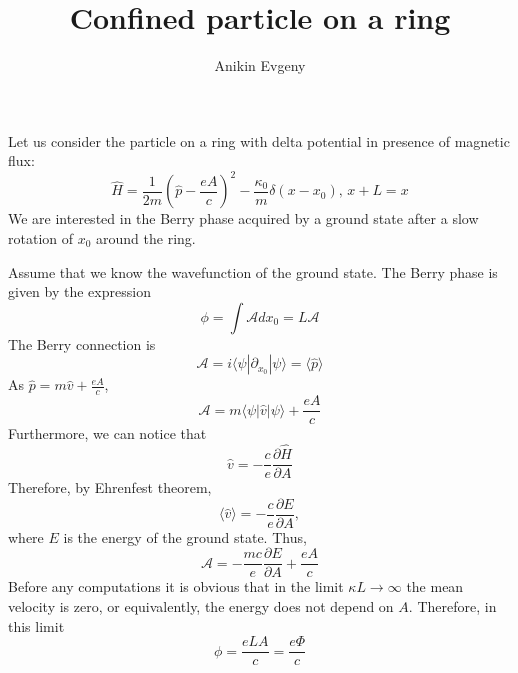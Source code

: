 \documentclass{article}
\title{Confined particle on a ring}
\author{Anikin Evgeny}
\begin{document}
\maketitle
Let us consider the particle on a ring with delta potential in presence of magnetic flux:
\begin{equation}
    \hat{H} = \frac{1}{2m}\left(\hat{p} - \frac{eA}{c}\right)^2 
            - \frac{\kappa_0}{m}\delta(x - x_0),
    \, x + L = x
\end{equation}
We are interested in the Berry phase acquired by a ground state 
after a slow rotation of $x_0$ around the ring.

Assume that we know the wavefunction of the ground state. The Berry phase is given
by the expression
\begin{equation}
    \phi = \int \mathcal{A} dx_0 = L\mathcal{A}
\end{equation}
The Berry connection is 
\begin{equation}
    \mathcal{A} = i\langle \psi | \partial_{x_0} | \psi \rangle =
            \langle \hat{p} \rangle
\end{equation}
As $\hat{p} = m\hat{v} + \frac{eA}{c}$,
\begin{equation}
    \mathcal{A} = m\langle \psi | \hat{v} | \psi \rangle 
             +\frac{eA}{c}
\end{equation}
Furthermore, we can notice that 
\begin{equation}
    \hat{v} = -\frac{c}{e}\frac{\partial \hat{H}}{\partial A}
\end{equation}
Therefore, by Ehrenfest theorem,
\begin{equation}
    \langle \hat{v} \rangle = -\frac{c}{e} \frac{\partial E}{\partial A},
\end{equation}
where $E$ is the energy of the ground state.
Thus,
\begin{equation}
    \mathcal{A} = -\frac{mc}{e}\frac{\partial E}{\partial A}
             +\frac{eA}{c}
\end{equation}
Before any computations it is obvious that in the limit $\kappa L \to \infty$ the mean 
velocity is zero, or equivalently, the energy does not depend on $A$. Therefore, in this limit
\begin{equation}
    \phi = \frac{eLA}{c} = \frac{e\Phi}{c}
\end{equation}
\end{document}
